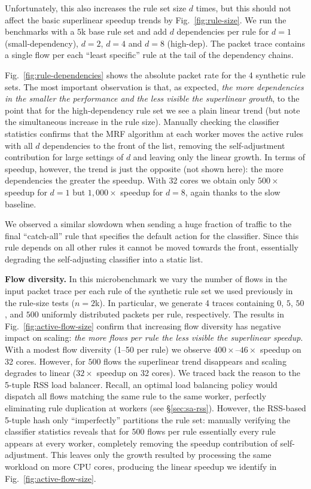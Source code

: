 \noindent %
Unfortunately, this also increases the rule set size $d$ times, but this should not affect the basic superlinear speedup trends by Fig.~\ref{fig:rule-size}. We run the benchmarks with a $5$k base rule set and add $d$ dependencies per rule for $d=1$ (small-dependency), $d=2$, $d=4$ and $d=8$ (high-dep). The packet trace contains a single flow per each ``least specific'' rule at the tail of the dependency chains.

Fig.~\ref{fig:rule-dependencies} shows the absolute packet rate for the 4 synthetic rule sets. The most important observation is that, as expected, \emph{the more dependencies in the smaller the performance and the less visible the superlinear growth}, to the point that for the high-dependency rule set we see a plain linear trend (but note the simultaneous increase in the rule size). Manually checking the classifier statistics confirms that the MRF algorithm at each worker moves the active rules with all $d$ dependencies to the front of the list, removing the self-adjustment contribution for large settings of $d$ and leaving only the linear growth. In terms of speedup, however, the trend is just the opposite (not shown here): the more dependencies the greater the speedup. With 32 cores we obtain only $500\times$ speedup for $d=1$ but $1,000\times$ speedup for $d=8$, again thanks to the slow baseline.

We observed a similar slowdown when sending a huge fraction of traffic to the final ``catch-all'' rule that specifies the default action for the classifier. Since this rule depends on all other rules it cannot be moved towards the front, essentially degrading the self-adjusting classifier into a static list.

\noindent
\textbf{Flow diversity.} %
In this microbenchmark we vary the number of flows in the input packet trace per each rule of the synthetic rule set we used previously in the rule-size tests ($n=2$k). In particular, we generate 4 traces containing $0$, $5$, $50$, and $500$ uniformly distributed packets per rule, respectively. The results in Fig.~\ref{fig:active-flow-size} confirm that increasing flow diversity has negative impact on scaling: \emph{the more flows per rule the less visible the superlinear speedup}. With a modest flow diversity (1--50 per rule) we observe $400\times$--$46\times$ speedup on 32 cores. However, for $500$ flows the superlinear trend disappears and scaling degrades to linear ($32\times$ speedup on 32 cores).  We traced back the reason to the 5-tuple RSS load balancer. Recall, an optimal load balancing policy would dispatch all flows matching the same rule to the same worker, perfectly eliminating rule duplication at workers (see \S\ref{sec:sa-rss}). However, the RSS-based 5-tuple hash only ``imperfectly'' partitions the rule set: manually verifying the classifier statistics reveals that for $500$ flows per rule essentially every rule appears at every worker, completely removing the speedup contribution of self-adjustment. This leaves only the growth resulted by processing the same workload on more CPU cores, producing the linear speedup we identify in Fig.~\ref{fig:active-flow-size}.


